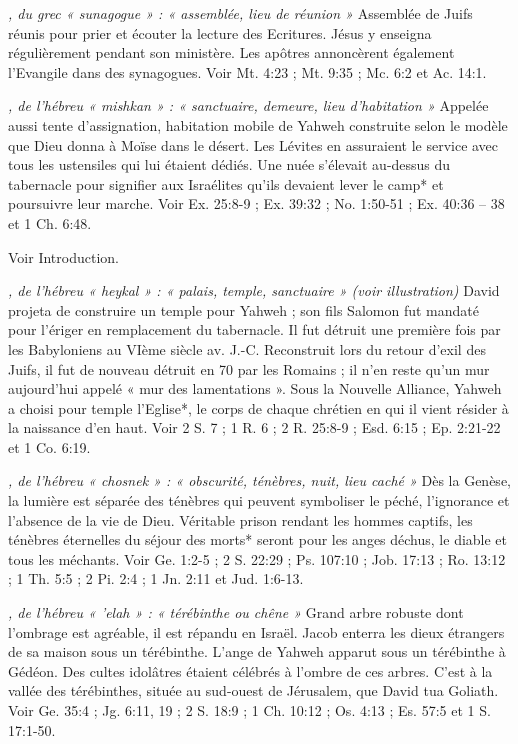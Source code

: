 \begin{multicols}{2}
\textit{, du grec « sunagogue » : « assemblée, lieu de réunion »}\newline
Assemblée de Juifs réunis pour prier et écouter la lecture des Ecritures. Jésus y enseigna régulièrement pendant son ministère. Les apôtres annoncèrent également l'Evangile dans des synagogues. Voir Mt. 4:23 ; Mt. 9:35 ; Mc. 6:2 et Ac. 14:1.

\textit{, de l'hébreu « mishkan » : « sanctuaire, demeure, lieu d'habitation »}\newline
Appelée aussi tente d'assignation, habitation mobile de Yahweh construite selon le modèle que Dieu donna à Moïse dans le désert. Les Lévites en assuraient le service avec tous les ustensiles qui lui étaient dédiés. Une nuée s'élevait au-dessus du tabernacle pour signifier aux Israélites qu'ils devaient lever le camp* et poursuivre leur marche. Voir Ex. 25:8-9 ; Ex. 39:32 ; No. 1:50-51 ; Ex. 40:36 – 38 et 1 Ch. 6:48.

\textit{}\newline
Voir Introduction.

\textit{, de l'hébreu « heykal » : « palais, temple, sanctuaire » (voir illustration)}\newline
David projeta de construire un temple pour Yahweh ; son fils Salomon fut mandaté pour l'ériger en remplacement du tabernacle. Il fut détruit une première fois par les Babyloniens au VIème siècle av. J.-C. Reconstruit lors du retour d'exil des Juifs, il fut de nouveau détruit en 70 par les Romains ; il n'en reste qu'un mur aujourd'hui appelé « mur des lamentations ». Sous la Nouvelle Alliance, Yahweh a choisi pour temple l'Eglise*, le corps de chaque chrétien en qui il vient résider à la naissance d'en haut. Voir 2 S. 7 ; 1 R. 6 ; 2 R. 25:8-9 ; Esd. 6:15 ; Ep. 2:21-22 et 1 Co. 6:19.

\textit{, de l'hébreu « chosnek » : « obscurité, ténèbres, nuit, lieu caché »}\newline
Dès la Genèse, la lumière est séparée des ténèbres qui peuvent symboliser le péché, l'ignorance et l'absence de la vie de Dieu. Véritable prison rendant les hommes captifs, les ténèbres éternelles du séjour des morts* seront pour les anges déchus, le diable et tous les méchants. Voir Ge. 1:2-5 ; 2 S. 22:29 ; Ps. 107:10 ; Job. 17:13 ; Ro. 13:12 ; 1 Th. 5:5 ; 2 Pi. 2:4 ; 1 Jn. 2:11 et Jud. 1:6-13.

\textit{, de l'hébreu « 'elah » : « térébinthe ou chêne »}\newline
Grand arbre robuste dont l'ombrage est agréable, il est répandu en Israël. Jacob enterra les dieux étrangers de sa maison sous un térébinthe. L'ange de Yahweh apparut sous un térébinthe à Gédéon. Des cultes idolâtres étaient célébrés à l'ombre de ces arbres. C'est à la vallée des térébinthes, située au sud-ouest de Jérusalem, que David tua Goliath. Voir Ge. 35:4 ; Jg. 6:11, 19 ; 2 S. 18:9 ; 1 Ch. 10:12 ; Os. 4:13 ; Es. 57:5 et 1 S. 17:1-50.


\end{multicols}
